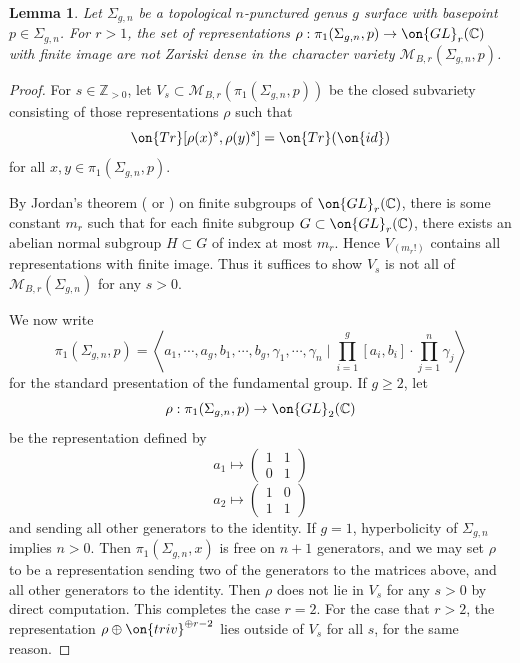 \documentclass[12 pt]{amsart}
\theoremstyle{plain}
\newtheorem{lemma}[subsubsection]{Lemma}
\theoremstyle{definition}
\theoremstyle{remark}
\numberwithin{equation}{section}
\begin{document}
\begin{lemma}
	\label{lemma:finite-image-not-dense}
	Let $\Sigma_{g,n}$ be a topological $n$-punctured genus $g$ surface with
	basepoint $p \in \Sigma_{g,n}$. For $r > 1$, the set of representations $\rho: \pi_1(\Sigma_{g,n},p) \to
	\on{GL}_r(\mathbb C)$ with finite image are not Zariski dense in the character
	variety $\mathscr{M}_{B,r}(\Sigma_{g,n}, p)$.
\end{lemma}
\begin{proof}

 For $s\in \mathbb{Z}_{>0}$, let $V_s\subset
 \mathscr{M}_{B,r}(\pi_1(\Sigma_{g,n},p))$ be the closed subvariety
	 consisting of those representations $\rho$ such that $$\on{Tr} [\rho(x)^s,
	 \rho(y)^s]=\on{Tr}(\on{id})$$ for all $x,y\in \pi_1(\Sigma_{g,n},p)$.

By Jordan's theorem (\cite[p.~91]{jordan1878memoire} or \cite[Theorem
36.13]{curtis1966representation}) on finite subgroups of $\on{GL}_r(\mathbb{C})$,
there is some constant $m_r$ such that for each finite subgroup $G\subset
\on{GL}_r(\mathbb{C})$, there exists an abelian normal subgroup $H\subset G$ of index
at most $m_r$. Hence $V_{(m_r!)}$ contains all representations with finite
image. Thus it suffices to show $V_s$ is not all of
$\mathscr{M}_{B,r}(\Sigma_{g,n})$ for any $s>0$. 

We now write $$\pi_1(\Sigma_{g,n},p)=\left\langle a_1, \cdots, a_g, b_1,\cdots,
b_g, \gamma_1, \cdots, \gamma_n \mid \prod_{i=1}^g [a_i,b_i]\cdot \prod_{j=1}^n
\gamma_j\right\rangle$$ for the standard presentation of the fundamental group.
If $g\geq 2$, let $$\rho: \pi_1(\Sigma_{g,n},p)\to \on{GL}_2(\mathbb{C})$$ be the representation defined by $$a_1 \mapsto \begin{pmatrix} 1 & 1 \\ 0 & 1 \end{pmatrix}$$
$$a_2 \mapsto \begin{pmatrix} 1 & 0 \\ 1 & 1 \end{pmatrix}$$
and sending all other generators to the identity.  If $g=1$, hyperbolicity of
$\Sigma_{g,n}$ implies $n>0$. Then $\pi_1(\Sigma_{g,n},x)$ is free on $n+1$ generators, and we may set $\rho$ to be a representation sending two of the generators to the matrices above, and all other generators to the identity. 
Then $\rho$ does not lie in $V_s$ for any $s>0$ by direct computation. This completes the case $r = 2$. For the case that $r > 2$, the representation $\rho\oplus \on{triv}^{\oplus r-2}$ lies outside of $V_s$ for all $s$, for the same reason.
\end{proof}
\end{document}
